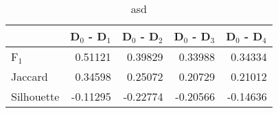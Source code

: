 \begin{table}
\centering
\caption{asd}
\label{tab:s1-cont-total-splitmerge-combined}
\begin{tabular}{lrrrr}
\toprule
{} &  D$_0$ - D$_1$ &  D$_0$ - D$_2$ &  D$_0$ - D$_3$ &  D$_0$ - D$_4$ \\
\midrule
F$_1$      &        0.51121 &        0.39829 &        0.33988 &        0.34334 \\
Jaccard    &        0.34598 &        0.25072 &        0.20729 &        0.21012 \\
Silhouette &       -0.11295 &       -0.22774 &       -0.20566 &       -0.14636 \\
\bottomrule
\end{tabular}
\end{table}
